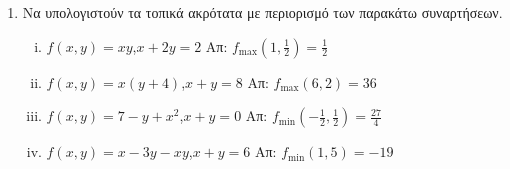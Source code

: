 \begin{enumerate}
\begin{enumerate}[i)]
        \end{enumerate}

    \item Να υπολογιστούν τα τοπικά ακρότατα με περιορισμό των παρακάτω συναρτήσεων.

        \begin{enumerate}[i)]
            \item $ f(x,y) = xy $,\quad $ x+2y = 2 $ \hfill Απ: 
                $ f_{\text{max}}(1, \frac{1}{2}) = \frac{1}{2}  $

            \item $ f(x,y) = x(y+4) $,\quad $ x+y=8 $ \hfill Απ: 
                $ f_{\text{max}}(6,2) = 36 $

            \item $ f(x,y) = 7-y+x^{2} $,\quad $ x+y=0 $ \hfill Απ: 
                $ f_{\text{min}}(- \frac{1}{2}, \frac{1}{2}) = \frac{27}{4}  $

            \item $ f(x,y) = x - 3y -xy $,\quad $ x+y=6 $ \hfill Απ: 
                $ f_{\text{min}}(1,5) = -19 $
        \end{enumerate}

\end{enumerate}


